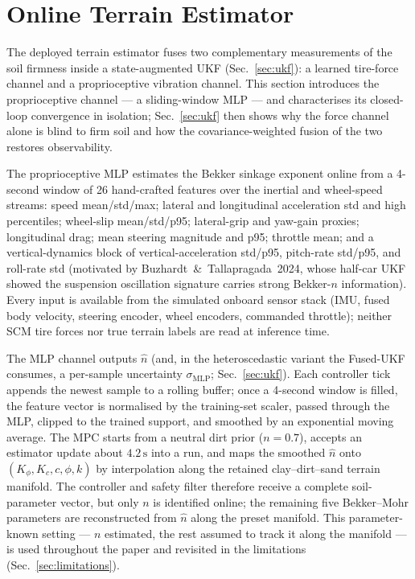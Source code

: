 \documentclass[conference,letterpaper,10pt]{IEEEtran}
\begin{document}
\section{Online Terrain Estimator}
\label{sec:estimator}

The deployed terrain estimator fuses two complementary measurements of
the soil firmness inside a state-augmented UKF (Sec.~\ref{sec:ukf}): a
learned tire-force channel and a proprioceptive vibration channel. This
section introduces the proprioceptive channel --- a sliding-window MLP
--- and characterises its closed-loop convergence in isolation;
Sec.~\ref{sec:ukf} then shows why the force channel alone is blind to
firm soil and how the covariance-weighted fusion of the two restores
observability.

The proprioceptive MLP estimates the Bekker sinkage exponent
online from a 4-second window of 26 hand-crafted features over the
inertial and wheel-speed streams: speed mean/std/max; lateral and
longitudinal acceleration std and high percentiles; wheel-slip
mean/std/p95; lateral-grip and yaw-gain proxies; longitudinal drag;
mean steering magnitude and p95; throttle mean; and a vertical-dynamics
block of vertical-acceleration std/p95, pitch-rate std/p95, and
roll-rate std (motivated by Buzhardt~\&~Tallapragada~2024, whose
half-car UKF showed the suspension oscillation signature carries
strong Bekker-$n$ information). Every input is available from the
simulated onboard sensor stack (IMU, fused body velocity, steering
encoder, wheel encoders, commanded throttle); neither SCM tire forces
nor true terrain labels are read at inference time.

The MLP channel outputs $\hat n$ (and, in the heteroscedastic variant
the Fused-UKF consumes, a per-sample uncertainty $\sigma_{\mathrm{MLP}}$;
Sec.~\ref{sec:ukf}). Each controller tick
appends the newest sample to a rolling buffer; once a 4-second window
is filled, the feature vector is normalised by the training-set
scaler, passed through the MLP, clipped to the trained support, and
smoothed by an exponential moving average. The MPC starts from a
neutral dirt prior ($n\!=\!0.7$), accepts an estimator update about
$4.2\,\mathrm{s}$ into a run, and maps the smoothed $\hat n$ onto
$(K_\phi,K_c,c,\phi,k)$ by interpolation along the retained
clay--dirt--sand terrain manifold. The controller and safety filter
therefore receive a complete soil-parameter vector, but only $n$ is
identified online; the remaining five Bekker--Mohr parameters are
reconstructed from $\hat n$ along the preset manifold. This
parameter-known setting --- $n$ estimated, the rest assumed to track it
along the manifold --- is used throughout the paper and revisited in the
limitations (Sec.~\ref{sec:limitations}).
\end{document}
